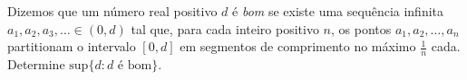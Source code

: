 Dizemos que um número real positivo \(d\) é \emph{bom} se existe uma sequência infinita \(a_1,a_2,a_3,\dots\in (0,d)\) tal que, para cada inteiro positivo \(n\), os pontos \(a_1,a_2,\dots,a_n\) partitionam o intervalo \([0,d]\) em segmentos de comprimento no máximo \(\frac{1}{n}\) cada. Determine \(\text{sup}\{d : d \text{ é bom}\}\).
